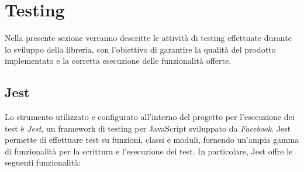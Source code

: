\section{Testing}
Nella presente sezione verranno descritte le attività di testing effettuate durante lo sviluppo della libreria, con l'obiettivo
di garantire la qualità del prodotto implementato e la corretta esecuzione delle funzionalità offerte.

\subsection{Jest}
Lo strumento utilizzato e configurato all'interno del progetto per l'esecuzione dei test è \textit{Jest}, un framework di testing
per JavaScript sviluppato da \textit{Facebook}. \newline
Jest permette di effettuare test su funzioni, classi e moduli, fornendo un'ampia gamma di funzionalità per la scrittura e l'esecuzione
dei test. \newline
In particolare, Jest offre le seguenti funzionalità:
